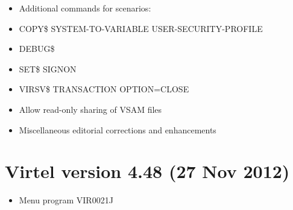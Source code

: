 \documentclass[letterpaper,10pt,english]{sphinxmanual}
\begin{document}
\begin{itemize}
\item {} 
Additional commands for scenarios:

\item {} 
COPY\$ SYSTEM-TO-VARIABLE USER-SECURITY-PROFILE

\item {} 
DEBUG\$

\item {} 
SET\$ SIGNON

\item {} 
VIRSV\$ TRANSACTION OPTION=CLOSE

\end{itemize}

\begin{itemize}
\item {} 
Allow read-only sharing of VSAM files

\end{itemize}

\begin{itemize}
\item {} 
Miscellaneous editorial corrections and enhancements

\end{itemize}


\section{Virtel version 4.48 (27 Nov 2012)}
\label{\detokenize{Installation_Guide:virtel-version-4-48-27-nov-2012}}
\begin{itemize}
\item {} 
Menu program VIR0021J

\end{itemize}
\end{document}
